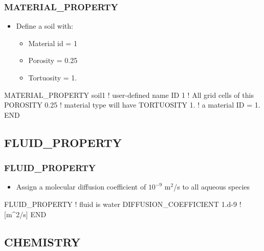\documentclass{beamer}
\newcommand\redcomment[1]{{{\color{red} #1}}}
\newcommand\bluecomment[1]{{{\color{blue} #1}}}
\begin{document}
\begin{frame}\frametitle{MATERIAL\_PROPERTY}

\begin{itemize}
  \item Define a soil with:
  \begin{itemize}
    \item Material id = 1
    \item Porosity = 0.25
    \item Tortuosity = 1.
  \end{itemize}
\end{itemize}

\begin{semiverbatim}


MATERIAL_PROPERTY soil1  \bluecomment{! user-defined name}
  ID 1                   \bluecomment{! All grid cells of this}
  POROSITY 0.25          \bluecomment{!   material type will have}
  TORTUOSITY 1.          \bluecomment{!   a material \redcomment{ID = 1}.}
END
\end{semiverbatim}

\end{frame}

\subsection{FLUID\_PROPERTY}

\begin{frame}\frametitle{FLUID\_PROPERTY}

\begin{itemize}
  \item Assign a molecular diffusion coefficient of $10^{-9}$ m$^2$/s to all aqueous species
\end{itemize}

\begin{semiverbatim}

FLUID_PROPERTY                  \bluecomment{! fluid is water}
  DIFFUSION_COEFFICIENT 1.d-9   \bluecomment{! [m^2/s]}
END
\end{semiverbatim}

\end{frame}

\subsection{CHEMISTRY}
\end{document}
